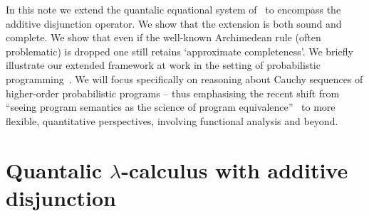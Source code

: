 \documentclass[a4paper,UKenglish,cleveref, autoref, thm-restate]{lipics-v2021}
\begin{document}

In this note we extend the quantalic equational system
of~\cite{dahlqvist22,dahlqvist2023syntactic} to encompass the additive
disjunction operator. We show that the extension is both sound and complete. We
show that even if the well-known Archimedean rule (often problematic) is
dropped one still retains `approximate completeness'. We briefly illustrate our
extended framework at work in the setting of probabilistic
programming~\cite{dahlqvist19,barthe20}. We will focus specifically on
reasoning about Cauchy sequences of higher-order probabilistic programs -- thus
emphasising the recent shift from ``seeing program semantics as the science of
program equivalence''~\cite{lago22} to more flexible, quantitative perspectives,
involving functional analysis and beyond.







\section{Quantalic $\lambda$-calculus with additive disjunction }
\end{document}
